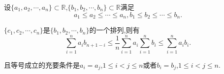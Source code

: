 \documentclass[../../main.tex]{subfiles}%
\begin{document}
\begin{theorem}[Chebeshev不等式]\label{theorem:Chebeshev不等式}
设\(\{a_1,a_2,\cdots,a_n\} \subset \mathbb{R}\),\(\{b_1,b_2,\cdots,b_n\} \subset \mathbb{R}\)满足
\[
a_1 \leqslant  a_2 \leqslant  \cdots \leqslant  a_n, b_1 \leqslant  b_2 \leqslant  \cdots \leqslant  b_n.
\]

\(\{c_1,c_2,\cdots,c_n\}\)是\(\{b_1,b_2,\cdots,b_n\}\)的一个排列,则有
\[
\sum\limits_{i = 1}^{n} a_i b_{n + 1 - i} \leqslant  \frac{1}{n} \sum\limits_{i = 1}^{n} a_i \sum\limits_{i = 1}^{n} b_i \leqslant  \sum\limits_{i = 1}^{n} a_i b_i.
\]

且等号成立的充要条件是\(a_i = a_j\),\(1 \leqslant  i < j \leqslant  n\)或者\(b_i = b_j\),\(1 \leqslant  i < j \leqslant  n\).
\end{theorem}
\end{document}
